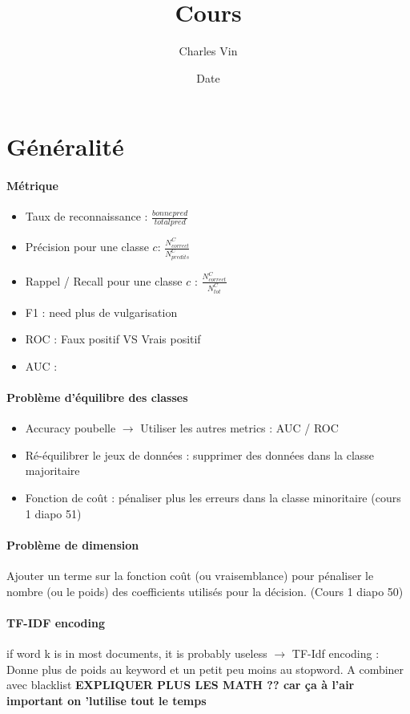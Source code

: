 \documentclass{article}
\title{Cours}
\author{Charles Vin}
\date{Date}
\theoremstyle{plain}%
\theoremstyle{definition}
\theoremstyle{remark}
\begin{document}
\maketitle

\section{Généralité}
\paragraph*{Métrique}
\begin{itemize}
    \item Taux de reconnaissance : $ \frac{bonne pred}{total pred} $ 
    \item Précision pour une classe $ c $: $ \frac{N^C_{correct}}{N^C_{predits}} $ 
    \item Rappel / Recall pour une classe $ c $ : $ \frac{N^C_{correct}}{N^C_{tot}} $
    \item F1 : need plus de vulgarisation
    \item ROC : Faux positif VS Vrais positif
    \item AUC : 
\end{itemize}

\paragraph*{Problème d'équilibre des classes}
\begin{itemize}
    \item Accuracy poubelle $\rightarrow$ Utiliser les autres metrics : AUC / ROC
    \item Ré-équilibrer le jeux de données : supprimer des données dans la classe majoritaire 
    \item Fonction de coût : pénaliser plus les erreurs dans la classe minoritaire (cours 1 diapo 51)
\end{itemize}

\paragraph*{Problème de dimension}
Ajouter un terme sur la fonction coût (ou vraisemblance) pour pénaliser le nombre (ou le poids) des coefficients utilisés pour la décision. (Cours 1 diapo 50)

\paragraph*{TF-IDF encoding} if word k is in most documents, it is probably useless $\rightarrow$ TF-Idf encoding : Donne plus de poids au keyword et un petit peu moins au stopword. A combiner avec blacklist \textbf{EXPLIQUER PLUS LES MATH ?? car ça à l'air important on 'lutilise tout le temps}
\end{document}
